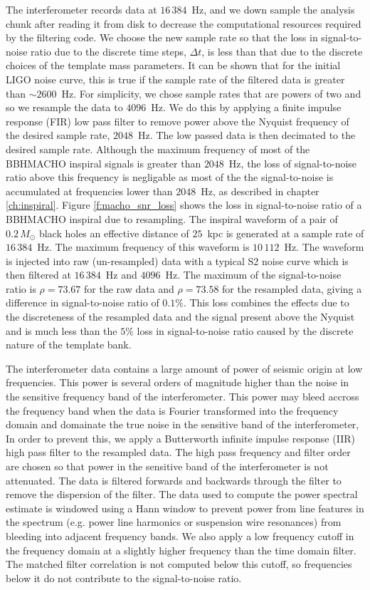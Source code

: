 The interferometer records data at $16\,384$~Hz, and we down sample the
analysis chunk after reading it from disk to decrease the computational
resources required by the filtering code. We choose the new sample rate so
that the loss in signal-to-noise ratio due to the discrete time steps, 
$\Delta t$, is less than that due to the discrete choices of the template mass
parameters. It can be shown that for the initial LIGO noise curve, this is
true if the sample rate of the filtered data is greater than $\sim
2600$~Hz\cite{Owen:1998dk}. For simplicity, we chose sample rates that are
powers of two and so we resample the data to $4096$~Hz.  We do this by
applying a finite impulse response (FIR) low pass filter to remove power above
the Nyquist frequency of the desired sample rate, $2048$~Hz. The low passed
data is then decimated to the desired sample rate. Although the maximum
frequency of most of the BBHMACHO inspiral signals is greater than $2048$~Hz,
the loss of signal-to-noise ratio above this frequency is negligable as most
of the the signal-to-noise is accumulated at frequencies lower than $2048$~Hz,
as described in chapter \ref{ch:inspiral}. Figure \ref{f:macho_snr_loss} shows
the loss in signal-to-noise ratio of a BBHMACHO inspiral due to resampling.
The inspiral waveform of a pair of $0.2\,M_\odot$ black holes an effective
distance of $25$~kpc is generated at a sample rate of $16\,384$~Hz. The
maximum frequency of this waveform is $10\,112$~Hz. The waveform is injected
into raw (un-resampled) data with a typical S2 noise curve which is then
filtered at $16\,384$~Hz and $4096$~Hz. The maximum of the signal-to-noise
ratio is $\rho = 73.67$ for the raw data and $\rho = 73.58$ for the resampled
data, giving a difference in signal-to-noise ratio of $0.1\%$. This loss
combines the effects due to the discreteness of the resampled data and the
signal present above the Nyquist and is much less than the $5\%$ loss in
signal-to-noise ratio caused by the discrete nature of the template bank.

The interferometer data contains a large amount of power of seismic origin at
low frequencies.  This power is several orders of magnitude higher than the
noise in the sensitive frequency band of the interferometer. This power may
bleed accross the frequency band when the data is Fourier transformed into the
frequency domain and domainate the true noise in the sensitive band of the
interferometer, In order to prevent this, we apply a Butterworth infinite
impulse response (IIR) high pass filter to the resampled data. The high pass
frequency and filter order are chosen so that power in the sensitive band of
the interferometer is not attenuated. The data is filtered forwards and
backwards through the filter to remove the dispersion of the filter.  The data
used to compute the power spectral estimate is windowed using a Hann window to
prevent power from line features in the spectrum (e.g. power line harmonics or
suspension wire resonances) from bleeding into adjacent frequency bands.
We also apply a low frequency cutoff in the frequency domain at a slightly
higher frequency than the time domain filter. The matched filter correlation
is not computed below this cutoff, so frequencies below it do not contribute
to the signal-to-noise ratio. 

